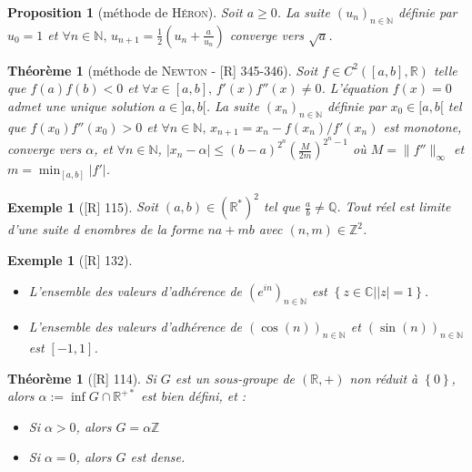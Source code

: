 \documentclass[10pt, a4paper, parskip=full, twoside, twocolumn]{report}
\newtheorem{theorem}[definition]{Théorème}
\newtheorem{proposition}[definition]{Proposition}
\newtheorem{example}[definition]{Exemple}
\newcommand{\IN}{\mathbb{N}}
\newcommand{\IZ}{\mathbb{Z}}
\newcommand{\IQ}{\mathbb{Q}}
\newcommand{\IC}{\mathbb{C}}
\newcommand{\IR}{\mathbb{R}}
\begin{document}
\begin{proposition}[méthode de \textsc{Héron}]
	Soit $a\geq 0$. La suite $\left(u_n\right)_{n\in\IN}$ définie par $u_0 = 1$ et $\forall n\in \IN,\, u_{n+1} = \frac{1}{2}(u_n + \frac{a}{u_n})$ converge vers $\sqrt{a}$.
\end{proposition}

\begin{theorem}[méthode de \textsc{Newton} - \textnormal{[R] 345-346}]
	Soit $f\in C^2([a,b], \IR)$ telle que $f(a)f(b) < 0$ et $\forall x \in [a,b],\, f'(x)f''(x) \neq 0$. L'équation $f(x) = 0$ admet une unique solution $a\in ]a,b[$.
	La suite $\left(x_n\right)_{n\in\IN}$ définie par $x_0\in [a,b[$ tel que $f(x_0)f''(x_0) > 0$ et $\forall n\in \IN,\, x_{n+1} = x_n - f(x_n)/f'(x_n)$ est monotone, converge vers $\alpha$, et $\forall n\in \IN$, 
	$\vert x_n - \alpha\vert \leq (b-a)^{2^n}\left(\frac{M}{2m}\right)^{2^n-1}$ où $M = \|f''\|_{\infty}$ et $m = \min_{[a,b]} \vert f'\vert$.
\end{theorem}

\begin{example}[\textnormal{[R] 115}]
	Soit $(a,b)\in\left(\IR^*\right)^2$ tel que $\frac{a}{b}\neq \IQ$. Tout réel est limite d'une suite d enombres de la forme $na + mb$ avec $(n,m)\in \IZ^2$.
\end{example}

\begin{example}[\textnormal{[R] 132}]
	\begin{itemize}
		\item L'ensemble des valeurs d'adhérence de $\left(e^{in}\right)_{n\in\IN}$ est $\left\{z\in\IC\mid \vert z\vert =1\right\}$.
		\item L'ensemble des valeurs d'adhérence de $\left(\cos(n)\right)_{n\in\IN}$ et $\left(\sin(n)\right)_{n\in\IN}$ est $[-1,1]$.
	\end{itemize}
\end{example}

\begin{theorem}[\textnormal{[R] 114}]
	Si $G$ est un sous-groupe de $(\IR,+)$ 
	non réduit à $\left\{0 \right\}$, alors $\alpha := \inf G\cap \IR^{+*}$ est bien défini, et :
	\begin{itemize}
		\item Si $\alpha > 0$, alors $G = \alpha\IZ$
		\item Si $\alpha = 0$, alors $G$ est dense.
	\end{itemize}
\end{theorem}
\end{document}
